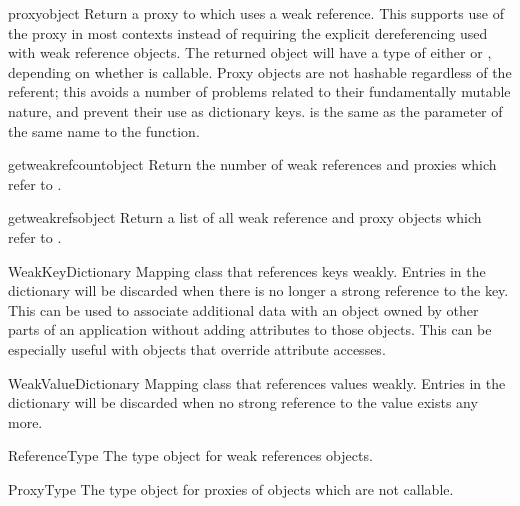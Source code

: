 \begin{funcdesc}{proxy}{object}
  Return a proxy to  which uses a weak reference.  This
  supports use of the proxy in most contexts instead of requiring the
  explicit dereferencing used with weak reference objects.  The
  returned object will have a type of either  or
  , depending on whether  is
  callable.  Proxy objects are not hashable regardless of the
  referent; this avoids a number of problems related to their
  fundamentally mutable nature, and prevent their use as dictionary
  keys.   is the same as the parameter of the same name
  to the  function.
\end{funcdesc}

\begin{funcdesc}{getweakrefcount}{object}
  Return the number of weak references and proxies which refer to
  .
\end{funcdesc}

\begin{funcdesc}{getweakrefs}{object}
  Return a list of all weak reference and proxy objects which refer to
  .
\end{funcdesc}

\begin{classdesc}{WeakKeyDictionary}{}
  Mapping class that references keys weakly.  Entries in the
  dictionary will be discarded when there is no longer a strong
  reference to the key.  This can be used to associate additional data
  with an object owned by other parts of an application without adding
  attributes to those objects.  This can be especially useful with
  objects that override attribute accesses.
\end{classdesc}

\begin{classdesc}{WeakValueDictionary}{}
  Mapping class that references values weakly.  Entries in the
  dictionary will be discarded when no strong reference to the value
  exists any more.
\end{classdesc}

\begin{datadesc}{ReferenceType}
  The type object for weak references objects.
\end{datadesc}

\begin{datadesc}{ProxyType}
  The type object for proxies of objects which are not callable.
\end{datadesc}

